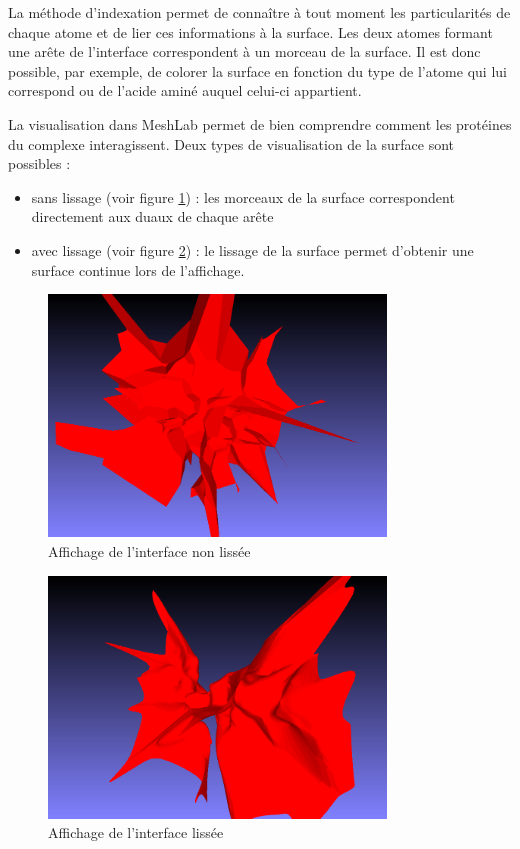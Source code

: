 La méthode d'indexation permet de connaître à tout moment les particularités de chaque
atome et de lier ces informations à la surface. Les deux atomes formant une arête
de l'interface correspondent à un morceau de la surface. Il est donc possible, par exemple,
de colorer la surface en fonction du type de l'atome qui lui correspond ou de l'acide aminé
auquel celui-ci appartient.

La visualisation dans MeshLab permet de bien comprendre comment les protéines du complexe interagissent.
Deux types de visualisation de la surface sont possibles :
\begin{itemize}
  \item sans lissage (voir figure \ref{fig::surf_no_smooth}) : les morceaux de la surface correspondent
  directement aux duaux de chaque arête
  \item avec lissage (voir figure \ref{fig::surf_smooth}) : le lissage de la surface
  permet d'obtenir une surface continue lors de l'affichage.
\end{itemize}

\begin{figure}[ht]
\centering
  \includegraphics[width=0.8\textwidth]{figures/surf_no_smooth.png}
  \caption{Affichage de l'interface non lissée}
  \label{fig::surf_no_smooth}
\end{figure}

\begin{figure}[ht]
\centering
  \includegraphics[width=0.8\textwidth]{figures/surf_smooth.png}
  \caption{Affichage de l'interface lissée}
  \label{fig::surf_smooth}
\end{figure}

